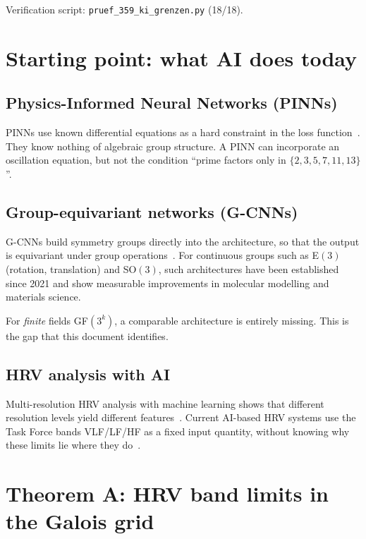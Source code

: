 Verification script: \texttt{pruef\_359\_ki\_grenzen.py} (18/18).

\section{Starting point: what AI does today}

\subsection*{Physics-Informed Neural Networks (PINNs)}

PINNs use known differential equations as a hard constraint
in the loss function \LM\,\cite{Raissi2024}. They know nothing of
algebraic group structure. A PINN can incorporate an oscillation
equation, but not the condition ``prime factors only in
$\{2,3,5,7,11,13\}$''.

\subsection*{Group-equivariant networks (G-CNNs)}

G-CNNs build symmetry groups directly into the architecture, so that
the output is equivariant under group operations \LM\,\cite{Finzi2022}.
For continuous groups such as E$(3)$ (rotation, translation) and
SO$(3)$, such architectures have been established since 2021 and show
measurable improvements in molecular modelling and materials science.

For \emph{finite} fields GF$(3^k)$, a comparable architecture is
entirely missing. This is the gap that this document identifies.

\subsection*{HRV analysis with AI}

Multi-resolution HRV analysis with machine learning shows that different
resolution levels yield different features \LM\,\cite{Gupta2024}. Current
AI-based HRV systems use the Task Force bands VLF/LF/HF as a fixed
input quantity, without knowing why these limits lie where they do
\LM\,\cite{Villanueva2026}.

\section{Theorem A: HRV band limits in the Galois grid}

